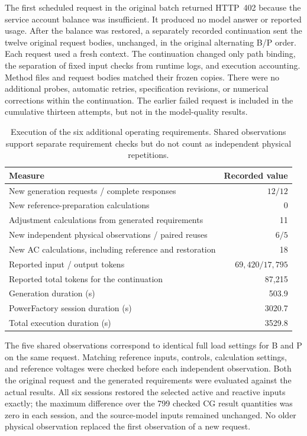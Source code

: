 The first scheduled request in the original batch returned HTTP~402 because the service account balance was insufficient. It produced no model answer or reported usage. After the balance was restored, a separately recorded continuation sent the twelve original request bodies, unchanged, in the original alternating B/P order. Each request used a fresh context. The continuation changed only path binding, the separation of fixed input checks from runtime logs, and execution accounting. Method files and request bodies matched their frozen copies. There were no additional probes, automatic retries, specification revisions, or numerical corrections within the continuation. The earlier failed request is included in the cumulative thirteen attempts, but not in the model-quality results.

\begin{table}[t]
\caption{Execution of the six additional operating requirements. Shared observations support separate requirement checks but do not count as independent physical repetitions.}
\label{tab:new-costs}
\small
\begin{tabularx}{\linewidth}{@{}Xr@{}}
\toprule
Measure & Recorded value \\
\midrule
New generation requests / complete responses & $12/12$ \\
New reference-preparation calculations & 0 \\
Adjustment calculations from generated requirements & 11 \\
New independent physical observations / paired reuses & $6/5$ \\
New AC calculations, including reference and restoration & 18 \\
Reported input / output tokens & $69{,}420/17{,}795$ \\
Reported total tokens for the continuation & 87,215 \\
Generation duration (s) & 503.9 \\
PowerFactory session duration (s) & 3020.7 \\
Total execution duration (s) & 3529.8 \\
\bottomrule
\end{tabularx}
\end{table}

The five shared observations correspond to identical full load settings for B and P on the same request. Matching reference inputs, controls, calculation settings, and reference voltages were checked before each independent observation. Both the original request and the generated requirements were evaluated against the actual results. All six sessions restored the selected active and reactive inputs exactly; the maximum difference over the 799 checked CG result quantities was zero in each session, and the source-model inputs remained unchanged. No older physical observation replaced the first observation of a new request.

